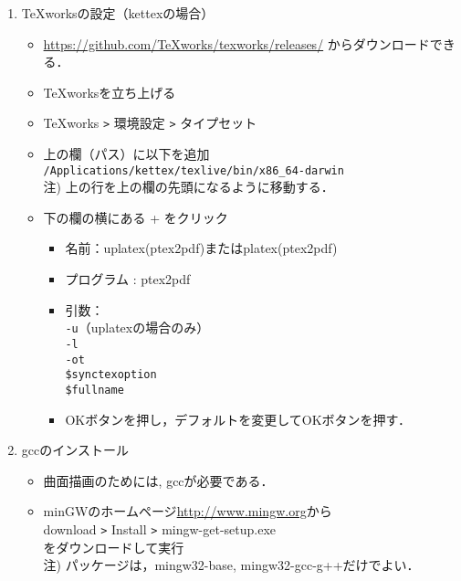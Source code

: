 \documentclass{ujarticle}
\begin{document}
\begin{enumerate}[\bf\large 1.]
\item TeXworksの設定（kettexの場合）
  \begin{itemize}
  \item \url{https://github.com/TeXworks/texworks/releases/} からダウンロードできる．
  \item TeXworksを立ち上げる
  \item TeXworks \verb|>| 環境設定 \verb|>| タイプセット
  \item 上の欄（パス）に以下を追加\\
  \hspace*{5mm}\verb|/Applications/kettex/texlive/bin/x86_64-darwin|\\
  \hspace*{10mm}注) 上の行を上の欄の先頭になるように移動する．
  \item 下の欄の横にある + をクリック
    \begin{itemize}
    \item 名前：uplatex(ptex2pdf)またはplatex(ptex2pdf)
    \item プログラム : ptex2pdf
    \item 引数：\\
    \hspace*{10mm} \verb|-u|（uplatexの場合のみ）\\
    \hspace*{10mm} \verb|-l|\\
    \hspace*{10mm} \verb|-ot|\\
    \hspace*{10mm}  \verb|$synctexoption|\\
    \hspace*{10mm}  \verb|$fullname|
    \item[]OKボタンを押し，デフォルトを変更してOKボタンを押す．
    \end{itemize}
  \end{itemize}
\item gccのインストール
  \begin{itemize}
    \item 曲面描画のためには, gccが必要である．
    \item minGWのホームページ\url{http://www.mingw.org}から\\
    \hspace*{10mm}download \verb|>| Install \verb|>| mingw-get-setup.exe\\
    をダウンロードして実行\\
    \hspace*{10mm}注) パッケージは，mingw32-base, mingw32-gcc-g++だけでよい．
  \end{itemize}
\end{enumerate}
\end{document}
